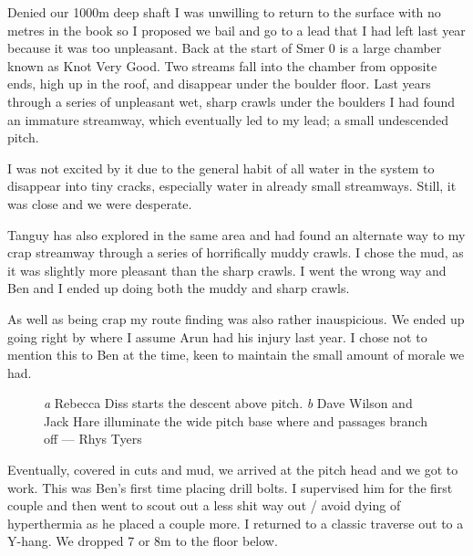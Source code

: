 Denied our 1000m deep shaft I was unwilling to return to the surface with no metres in the book so I proposed we bail and go to a lead that I had left last year because it was too unpleasant. Back at the start of Smer 0 is a large chamber known as Knot Very Good. Two streams fall into the chamber from opposite ends, high up in the roof, and disappear under the boulder floor. Last years through a series of unpleasant wet, sharp crawls under the boulders I had found an immature streamway, which eventually led to my lead; a small undescended pitch.
 
I was not excited by it due to the general habit of all water in the system to disappear into tiny cracks, especially water in already small streamways. Still, it was close and we were desperate.
 
Tanguy has also explored in the same area and had found an alternate way to my crap streamway through a series of horrifically muddy crawls. I chose the mud, as it was slightly more pleasant than the sharp crawls. I went the wrong way and Ben and I ended up doing both the muddy and sharp crawls.
 
As well as being crap my route finding was also rather inauspicious. We ended up going right by where I assume Arun had his injury last year. I chose not to mention this to Ben at the time, keen to maintain the small amount of morale we had.

 \begin{figure}[t!]
\checkoddpage \ifoddpage \forcerectofloat \else \forceversofloat \fi
\centering
\begin{subfigure}[t]{0.685\textwidth}
\centering
{}
 \caption{}\label{water hallelujah}
\end{subfigure}
    \hfill
    \begin{subfigure}[t]{0.305\textwidth}
        \centering
        \caption{} \label{Diss and Dave}
    \end{subfigure}
    \caption{
    \emph{a} Rebecca Diss starts the descent above  pitch.
    \emph{b} Dave Wilson and Jack Hare illuminate the wide pitch base where  and  passages branch off --- Rhys Tyers}
\end{figure}
 
Eventually, covered in cuts and mud, we arrived at the pitch head and we got to work. This was Ben’s first time placing drill bolts. I supervised him for the first couple and then went to scout out a less shit way out / avoid dying of hyperthermia as he placed a couple more. I returned to a classic traverse out to a Y-hang. We dropped 7 or 8m to the floor below.
 

